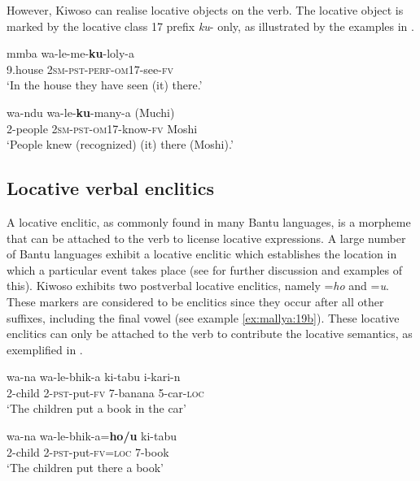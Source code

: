 \documentclass[output=paper]{langscibook}
\begin{document}
However, Kiwoso can realise locative objects on the verb. The locative object is marked by the locative class 17 prefix \textit{ku}{}- only, as illustrated by the examples in .

    \ea\label{ex:mallya:18}
    \ea\label{ex:mallya:18a}
    \gll mmba      wa-le-me-\textbf{{ku}}-loly-a\\
      9.house    2\textsc{sm}-\textsc{pst}-\textsc{perf}-\textsc{om}17-see-\textsc{fv}\\
     \glt ‘In the house they have seen (it) there.’

    \ex\label{ex:mallya:18b}
    \gll wa-ndu      wa-le-\textbf{{ku}}-many-a      (Muchi)\\
     2-people    2\textsc{sm}-\textsc{pst}-\textsc{om}17-know-\textsc{fv}    Moshi\\
     \glt ‘People knew (recognized) (it) there (Moshi).’
    \z
\z

\subsection{Locative verbal enclitics}
\label{sec:mallya:4.5}

A locative enclitic, as commonly found in many Bantu languages, is a morpheme that can be attached to the verb to license locative expressions. A large number of Bantu languages exhibit a locative enclitic which establishes the location in which a particular event takes place (see \citealt{PersohnDevos2017} for further discussion and examples of this). Kiwoso exhibits two postverbal locative enclitics, namely =\textit{ho} and =\textit{u}. These markers are considered to be enclitics since they occur after all other suffixes, including the final vowel (see example \ref{ex:mallya:19b}). These locative enclitics can only be attached to the verb to contribute the locative semantics, as exemplified in .

  \ea\label{ex:mallya:19}    
  \ea\label{ex:mallya:19a}
  \gll wa-na   wa-le-bhik-a     ki-tabu     i-kari-n\\
    2-child  2-\textsc{pst}-put-\textsc{fv}    7-banana    5-car-\textsc{loc}\\
   \glt  ‘The children put a book in the car’

    \ex\label{ex:mallya:19b}
    \gll wa-na   wa-le-bhik-a=\textbf{{ho/u}} ki-tabu\\
     2-child  2-\textsc{pst}-put-\textsc{fv}=\textsc{loc}    7-book  \\
    \glt ‘The children put there a book’
\end{document}
